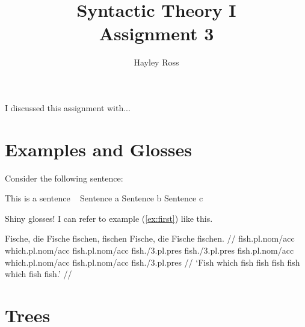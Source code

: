 \documentclass[11pt,letterpaper, fleqn]{article}
\title{Syntactic Theory I\\Assignment 3} %
\author{Hayley Ross} %
\begin{document}
\maketitle
\thispagestyle{fancy}

I discussed this assignment with...

\section{Examples and Glosses}

Consider the following sentence:

\ex This is a sentence \label{ex:first}
\xe
\pex~ %
\a \ljudge{*} Sentence a
\a \ljudge{\#} Sentence b
\a Sentence c
\xe

Shiny glosses! I can refer to example (\ref{ex:first}) like this. %

\ex
\begingl
\gla Fische, die Fische fischen, fischen Fische, die Fische fischen. //
\glb fish.{\sc pl.nom/acc} which.{\sc pl.nom/acc} fish.{\sc pl.nom/acc} fish.{/3.pl.pres} fish.{/3.pl.pres} fish.{\sc pl.nom/acc} which.{\sc pl.nom/acc} fish.{\sc pl.nom/acc} fish.{/3.pl.pres} //
\glft `Fish which fish fish fish fish which fish fish.' //
\endgl
\xe

\newpage

\section{Trees}
\end{document}
